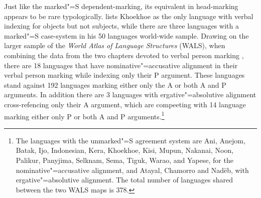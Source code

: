 Just like the marked"=S dependent-marking, its equivalent in head-marking appears to be rare typologically.
\citet{Miestamo:2008} lists Khoekhoe as the only language with verbal indexing for objects but not subjects, while there are three languages with a marked"=S case-system in his 50 languages world-wide sample. 
Drawing on the larger sample of the \emph{World Atlas of Language Structures} (WALS), when combining the data from the two chapters devoted to verbal person marking \citep{WALS100, WALS102}, there are 18 languages that have nominative"=accusative alignment in their verbal person marking while indexing only their P argument.
These languages stand against 192 languages marking either only the A or both A and P arguments.
In addition there are 3 languages with ergative"=absolutive alignment cross-refencing only their A argument, which are compeeting with 14 language marking either only P or both A and P arguments.\footnote{The languages with the unmarked"=S agreement system are \textdoublevertline Ani, Anejom, Batak, Ijo, Indonesian, Kera, Khoekhoe, Kisi, Mupun, Nakanai, Noon, Palikur, Panyjima, Selknam, Sema, Tiguk, Warao, and Yapese, for the nominative"=accusative alignment, and Atayal, Chamorro and Nad\"eb, with ergative"=absolutive alignment. The total number of languages shared between the two WALS maps is 378.} 

